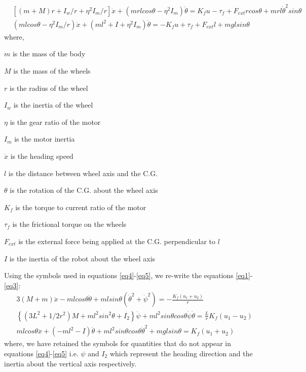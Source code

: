 \documentclass[a4paper,10pt]{article}
\begin{document}
\begin{align}
 &[(m+M)r+I_w/r+\eta^2I_m/r]\ddot{x}+(mrlcos\theta-\eta^2I_m)\ddot{\theta} = K_fu-\tau_f+F_{ext}rcos\theta+mrl\dot{\theta}^2sin\theta \label{eq4}\\
 &(mlcos\theta - \eta^2I_m/r)\ddot{x} + (ml^2 + I + \eta^2I_m)\ddot{\theta} = - K_fu + \tau_f + F_{ext}l + mglsin\theta \label{eq5}
\end{align} where,

$m$ is the mass of the body

$M$ is the mass of the wheels

$r$ is the radius of the wheel

$I_w$ is the inertia of the wheel

$\eta$ is the gear ratio of the motor

$I_m$ is the motor inertia

$\dot{x}$ is the heading speed

$l$ is the distance between wheel axis and the C.G.

$\theta$ is the rotation of the C.G. about the wheel axis

$K_f$ is the torque to current ratio of the motor

$\tau_f$ is the frictional torque on the wheels

$F_{ext}$ is the external force being applied at the C.G. perpendicular to $l$

$I$ is the inertia of the robot about the wheel axis \newline

Using the symbols used in equations \ref{eq4}-\ref{eq5}, we re-write the equations \ref{eq1}-\ref{eq3}:
\begin{align}
 &3(M+m)\ddot{x}-mlcos\theta\ddot{\theta}+mlsin\theta({\dot{\theta}}^2+{\dot{\psi}}^2)=-\frac{K_f(u_1+u_2)}{r} \label{eq6} \\
 &\left\lbrace(3L^2+1/2r^2)M+ml^2sin^2\theta+I_2\right\rbrace\ddot{\psi}+ml^2sin\theta cos\theta\dot{\psi}\dot{\theta}=\frac{L}{r}K_f(u_1-u_2) \label{eq7} \\
 &mlcos\theta\ddot{x}+(-ml^2-I)\ddot{\theta}+ml^2sin\theta cos\theta {\dot{\theta}}^2+mglsin\theta=K_f(u_1+u_2) \label{eq8}
\end{align} where, we have retained the symbols for quantities that do not appear in equations 
\ref{eq4}-\ref{eq5} i.e. $\psi$ and $I_2$ which represent the heading direction and the inertia 
about the vertical axis respectively.
\end{document}
